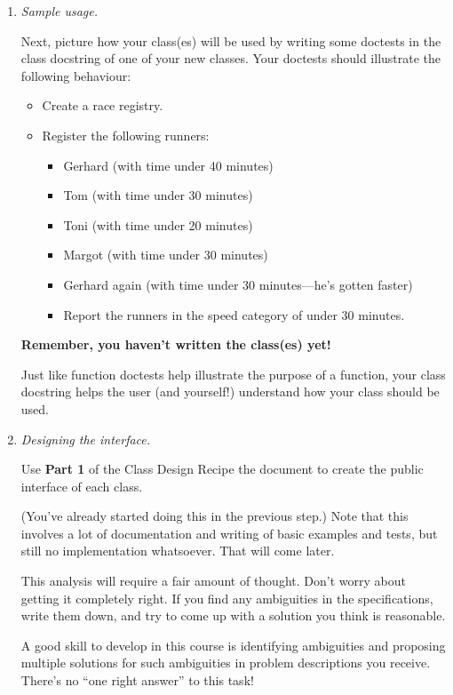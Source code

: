 \documentclass[12pt]{article}
\begin{document}
\begin{enumerate}[1.]
\item \textit{Sample usage.}

Next, picture how your class(es) will be used by writing some doctests in the class
docstring of one of your new classes. Your doctests should illustrate the following
behaviour:

\begin{itemize}
    \item Create a race registry.
    \item Register the following runners:
    \begin{itemize}
        \item Gerhard (with time under 40 minutes)
        \item Tom (with time under 30 minutes)
        \item Toni (with time under 20 minutes)
        \item Margot (with time under 30 minutes)
        \item Gerhard again (with time under 30 minutes—he’s gotten faster)
        \item Report the runners in the speed category of under 30 minutes.
    \end{itemize}
\end{itemize}

\bigskip

\textbf{Remember, you haven’t written the class(es) yet!}

Just like function doctests help illustrate the purpose of a function, your class
docstring helps the user (and yourself!) understand how your class should be used.

\item \textit{Designing the interface.}

Use \textbf{Part 1} of the Class Design Recipe the document to create the public
interface of each class.

(You’ve already started doing this in the previous step.) Note that this involves
a lot of documentation and writing of basic examples and tests, but still no
implementation whatsoever. That will come later.

\bigskip

This analysis will require a fair amount of thought. Don’t worry about getting it
completely right. If you find any ambiguities in the specifications, write them
down, and try to come up with a solution you think is reasonable.

\bigskip

A good skill to develop in this course is identifying ambiguities and proposing
multiple solutions for such ambiguities in problem descriptions you receive.
There’s no “one right answer” to this task!

\end{enumerate}
\end{document}
